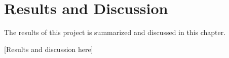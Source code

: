 \chapter{Results and Discussion}\label{chap:results}
\begin{overview}
  The results of this project is summarized and discussed in this chapter.
\end{overview}

[Results and discussion here]

